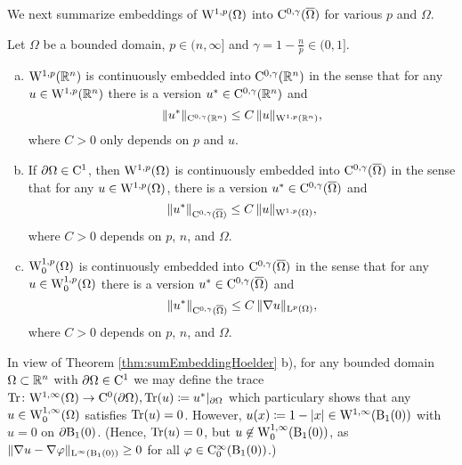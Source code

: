 We next summarize embeddings of $\mathrm{W}^{1,p}(\Omega)$ into $\mathrm{C}^{0,\gamma}(\overline\Omega)$ for various $p$ and $\Omega$.

\begin{thm}
  \label{thm:sumEmbeddingHoelder}
Let $\Omega$ be a bounded domain, $p \in (n,\infty]$ and $\gamma = 1 - \frac{n}{p} \in (0,1]$.
\begin{enumerate}[a)]
  \item $\mathrm{W}^{1,p}(\mathbb{R}^n)$ is continuously embedded into $\mathrm{C}^{0,\gamma}(\mathbb{R}^n)$ in the sense that for any $u \in \mathrm{W}^{1,p}(\mathbb{R}^n)$ there is a version $u^* \in \mathrm{C}^{0,\gamma}(\mathbb{R}^n)$ and
    $$
    \|u^*\|_{\mathrm{C}^{0,\gamma}(\mathbb{R}^n)} \leq C \, \|u\|_{\mathrm{W}^{1,p}(\mathbb{R}^n)},
    $$
    where $C > 0$ only depends on $p$ and $u$.

  \item If $\partial\Omega \in \mathrm{C}^1$, then $\mathrm{W}^{1,p}(\Omega)$ is continuously embedded into $\mathrm{C}^{0,\gamma}(\overline\Omega)$ in the sense that for any $u \in \mathrm{W}^{1,p}(\Omega)$, there is a version $u^* \in \mathrm{C}^{0,\gamma}(\overline\Omega)$ and 
    $$
    \|u^*\|_{\mathrm{C}^{0,\gamma}(\overline\Omega)} \leq C \, \|u\|_{\mathrm{W}^{1,p}(\Omega)},
    $$
    where $C > 0$ depends on $p$, $n$, and $\Omega$.

  \item $\mathrm{W}_0^{1,p}(\Omega)$ is continuously embedded into $\mathrm{C}^{0,\gamma}(\overline\Omega)$ in the sense that for any $u \in \mathrm{W}_0^{1,p}(\Omega)$ there is a version $u^* \in \mathrm{C}^{0,\gamma}(\overline\Omega)$ and
    $$
    \| u^* \|_{\mathrm{C}^{0,\gamma}(\overline\Omega)} \leq C \, \|\nabla u\|_{\mathrm{L}^p(\Omega)},
    $$
    where $C > 0$ depends on $p$, $n$, and $\Omega$.
\end{enumerate}
\end{thm}

\begin{rem}
      In view of Theorem \ref{thm:sumEmbeddingHoelder} b), for any bounded domain $\Omega \subset \mathbb{R}^n$ with $\partial\Omega \in \mathrm{C}^1$ we may define the trace $\operatorname{Tr} \colon \mathrm{W}^{1,\infty}(\Omega) \to \mathrm{C}^0(\partial\Omega), \operatorname{Tr}(u) \coloneqq u^*|_{\partial\Omega}$ which particulary shows that any $u \in \mathrm{W}_0^{1,\infty}(\Omega)$ satisfies $\operatorname{Tr}(u) = 0$.
      However, $u(x) \coloneqq 1 - |x| \in \mathrm{W}^{1,\infty}(\mathrm{B}_1(0))$ with $u = 0$ on $\partial\mathrm{B}_1(0)$. (Hence, $\operatorname{Tr}(u) = 0$, but $u \not\in \mathrm{W}_0^{1,\infty}(\mathrm{B}_1(0))$, as $\|\nabla u - \nabla \varphi\|_{\mathrm{L}^\infty(\mathrm{B}_1(0))} \geq 0$ for all $\varphi \in \mathrm{C}_0^\infty(\mathrm{B}_1(0))$.)
\end{rem}

